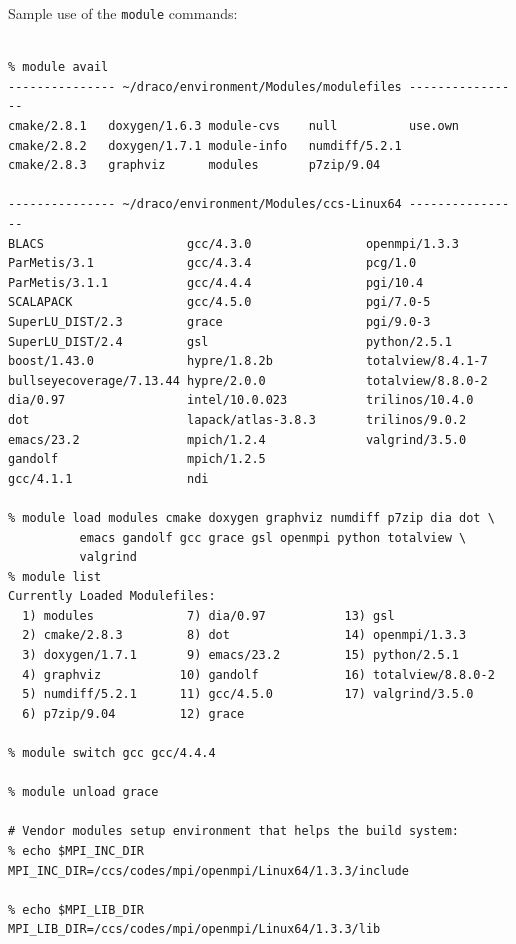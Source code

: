 \documentclass[note]{ResearchNote_pdf}
\begin{document}
Sample use of the \texttt{module} commands:
\begin{lstlisting}[basicstyle=\footnotesize, xleftmargin=0.5in, 
  xrightmargin=0.5in]
% module clear 

% module avail
--------------- ~/draco/environment/Modules/modulefiles ----------------
cmake/2.8.1   doxygen/1.6.3 module-cvs    null          use.own
cmake/2.8.2   doxygen/1.7.1 module-info   numdiff/5.2.1
cmake/2.8.3   graphviz      modules       p7zip/9.04

--------------- ~/draco/environment/Modules/ccs-Linux64 ----------------
BLACS                    gcc/4.3.0                openmpi/1.3.3
ParMetis/3.1             gcc/4.3.4                pcg/1.0
ParMetis/3.1.1           gcc/4.4.4                pgi/10.4
SCALAPACK                gcc/4.5.0                pgi/7.0-5
SuperLU_DIST/2.3         grace                    pgi/9.0-3
SuperLU_DIST/2.4         gsl                      python/2.5.1
boost/1.43.0             hypre/1.8.2b             totalview/8.4.1-7
bullseyecoverage/7.13.44 hypre/2.0.0              totalview/8.8.0-2
dia/0.97                 intel/10.0.023           trilinos/10.4.0
dot                      lapack/atlas-3.8.3       trilinos/9.0.2
emacs/23.2               mpich/1.2.4              valgrind/3.5.0
gandolf                  mpich/1.2.5
gcc/4.1.1                ndi

% module load modules cmake doxygen graphviz numdiff p7zip dia dot \
          emacs gandolf gcc grace gsl openmpi python totalview \
          valgrind
% module list
Currently Loaded Modulefiles:
  1) modules             7) dia/0.97           13) gsl
  2) cmake/2.8.3         8) dot                14) openmpi/1.3.3
  3) doxygen/1.7.1       9) emacs/23.2         15) python/2.5.1
  4) graphviz           10) gandolf            16) totalview/8.8.0-2
  5) numdiff/5.2.1      11) gcc/4.5.0          17) valgrind/3.5.0
  6) p7zip/9.04         12) grace

% module switch gcc gcc/4.4.4

% module unload grace

# Vendor modules setup environment that helps the build system:
% echo $MPI_INC_DIR
MPI_INC_DIR=/ccs/codes/mpi/openmpi/Linux64/1.3.3/include

% echo $MPI_LIB_DIR
MPI_LIB_DIR=/ccs/codes/mpi/openmpi/Linux64/1.3.3/lib
\end{lstlisting}
\end{document}
